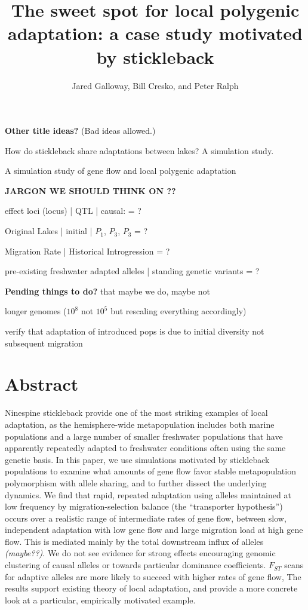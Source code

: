 \documentclass{article}
\begin{document}
\title{The sweet spot for local polygenic adaptation: a case study motivated by stickleback}
\author{Jared Galloway, Bill Cresko, and Peter Ralph}
\maketitle

\textbf{Other title ideas?} (Bad ideas allowed.)

How do stickleback share adaptations between lakes? A simulation study.

A simulation study of gene flow and local polygenic adaptation


\textbf{JARGON WE SHOULD THINK ON ??}

effect loci (locus) | QTL | causal: = ?
 
Original Lakes | initial | $P_{1}$, $P_{3}$, $P_{3}$ = ?

Migration Rate | Historical Introgression = ?

pre-existing freshwater adapted alleles | standing genetic variants = ?


\textbf{Pending things to do?} that maybe we do, maybe not

longer genomes ($10^8$ not $10^5$ but rescaling everything accordingly)

verify that adaptation of introduced pops is due to initial diversity not subsequent migration

\section{Abstract}

Ninespine stickleback provide one of the most striking examples of local adaptation,
as the hemisphere-wide metapopulation includes both marine populations
and a large number of smaller freshwater populations
that have apparently repeatedly adapted to freshwater conditions
often using the same genetic basis.
In this paper, we use simulations motivated by stickleback populations
to examine what amounts of gene flow favor stable metapopulation polymorphism
with allele sharing,
and to further dissect the underlying dynamics.
We find that rapid, repeated adaptation 
using alleles maintained at low frequency by migration-selection balance
(the ``transporter hypothesis'')
occurs over a realistic range of intermediate rates of gene flow,
between slow, independent adaptation with low gene flow
and large migration load at high gene flow.
This is mediated mainly by the total downstream influx of alleles \emph{(maybe??)}.
We do not see evidence for strong effects encouraging genomic clustering of causal alleles
or towards particular dominance coefficients.
$F_{ST}$ scans for adaptive alleles are more likely to succeed with higher rates of gene flow,
The results support existing theory of local adaptation,
and provide a more concrete look at a particular, empirically motivated example.
\end{document}

